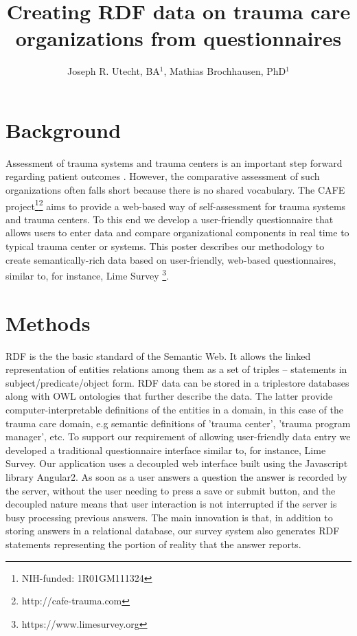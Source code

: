 \documentclass{amia}
\begin{document}
\title{Creating RDF data on trauma care organizations from questionnaires}

\author{Joseph R. Utecht, BA$^{1}$, Mathias Brochhausen, PhD$^{1}$}


\maketitle

\section*{Background}

Assessment of trauma systems and trauma centers is an important step forward regarding patient outcomes \cite{ref1, ref2}.
However, the comparative assessment of such organizations often falls short because there is no shared vocabulary.
The CAFE project\footnote{NIH-funded: 1R01GM111324}\footnote{http://cafe-trauma.com} aims to provide a web-based way of self-assessment for trauma systems and trauma centers. 
To this end we develop a user-friendly questionnaire that allows users to enter data and compare organizational components in real time to typical trauma center or systems.
This poster describes our methodology to create semantically-rich data based on user-friendly, web-based questionnaires, similar to, for instance, Lime Survey \footnote{https://www.limesurvey.org}. 

\section*{Methods}
RDF is the the basic standard of the Semantic Web. It allows the linked representation of entities relations among them as a set of triples -- statements in subject/predicate/object form. RDF data can be stored in a triplestore databases along with OWL ontologies that further describe the data. The latter provide computer-interpretable definitions of the entities in  a domain, in this case of the trauma care domain, e.g semantic definitions of 'trauma center', 'trauma program manager', etc. 
To support our requirement of allowing user-friendly data entry we developed a traditional questionnaire interface similar to, for instance, Lime Survey\cite{TODO}. 
Our application uses a decoupled web interface built using the Javascript library Angular2\cite{TODO}.
As soon as a user answers a question the answer is recorded by the server, without the user needing to press a save or submit button, and the decoupled nature means that user interaction is not interrupted if the server is busy processing previous answers.
The main innovation is that, in addition to storing answers in a relational database, our survey system also generates RDF statements representing the portion of reality that the answer reports.
\end{document}
